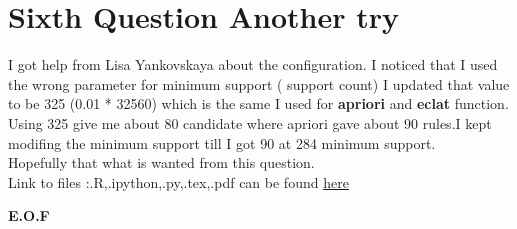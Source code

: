 \documentclass{article}
\begin{document}
\section*{Sixth Question Another try}
I got help from Lisa Yankovskaya about the configuration. I noticed that I used the wrong parameter for minimum support ( support count) I updated that value to be 325 (0.01 * 32560) which is the same I used for \textbf{apriori} and \textbf{eclat} function. Using 325 give me about 80 candidate where apriori gave about 90 rules.I kept modifing the minimum support till I got 90 at 284 minimum support.\\
Hopefully that what is wanted from this question.\\
Link to files :.R,.ipython,.py,.tex,.pdf can be found \href{https://github.com/aqeel13932/DM/tree/master/HW07}{here}
\begin{center}
\textbf{E.O.F}
\end{center}
\end{document}

